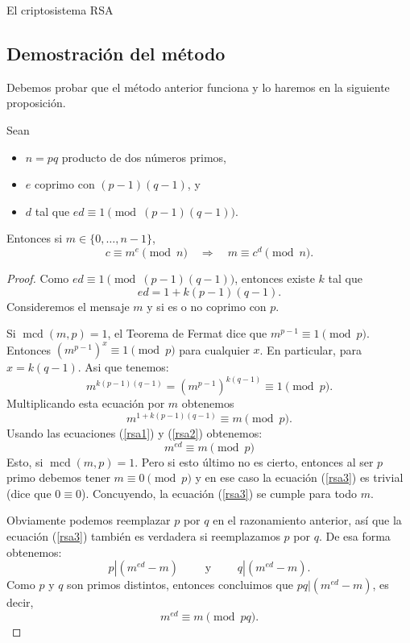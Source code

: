 \begin{section}{El criptosistema RSA}
\subsection*{Demostración del método}

Debemos probar que el método anterior funciona  y lo haremos en la siguiente proposición.

\begin{proposicion} \label{rsa}
    Sean 
    \begin{itemize}
        \item $n =pq$ producto de dos números primos,
        \item $e$ coprimo con $(p-1)(q-1)$, y
        \item $d$ tal que  $ed \equiv 1 \pmod{(p-1)(q-1)}$.
    \end{itemize}
    Entonces si $m \in \{0,\ldots,n-1\}$,  
    $$c \equiv m^e \pmod{n}\quad \Rightarrow \quad m \equiv c^d \pmod{n}.$$
\end{proposicion} 
\begin{proof}
Como $ed \equiv 1 \pmod{(p - 1)(q - 1)}$, entonces existe $k$ tal que  
\begin{equation}\label{rsa1}
ed = 1 + k(p - 1)(q - 1).
\end{equation}
Consideremos el mensaje $m$ y si es o no coprimo con $p$.

Si $\operatorname{mcd}(m, p) = 1$, el Teorema de Fermat dice que $m^{p - 1}  \equiv 1\pmod{p}$.
Entonces $(m^{p - 1})^x \equiv 1\pmod{p}$ para cualquier $x$. En particular, para 
$x = k(q-1)$. Asi que tenemos:
\begin{equation*}
m^{k(p-1)(q-1)} = (m^{p-1})^{k(q-1)} \equiv 1\pmod{p}.
\end{equation*}
Multiplicando esta ecuación por $m$ obtenemos
\begin{equation}\label{rsa2}
m^{1+k(p-1)(q-1)} \equiv m\pmod{p}. 
\end{equation}
Usando las ecuaciones (\ref{rsa1}) y (\ref{rsa2}) obtenemos:
\begin{equation}\label{rsa3}
m^{ed} \equiv m\pmod{p} 
\end{equation}
Esto, si  $\operatorname{mcd}(m, p) = 1$. Pero si esto último no es cierto, entonces al ser $p$
primo debemos tener $m \equiv 0\pmod{p}$ y en ese caso la ecuación (\ref{rsa3}) es trivial (dice que $0 \equiv 0$). Concuyendo, la ecuación (\ref{rsa3}) se cumple para todo $m$.

Obviamente podemos reemplazar $p$ por $q$ en el razonamiento anterior, así que la ecuación (\ref{rsa3}) también es verdadera si reemplazamos $p$ por $q$. De esa forma obtenemos:
$$p|(m^{ed}-m) \qquad \text{ y } \qquad q|(m^{ed}-m).$$
Como $p$ y $q$ son primos distintos, entonces concluimos que $pq|(m^{ed}-m)$, es decir, $$m^{ed} \equiv m \pmod{pq}.$$
\end{proof}


\end{section}
